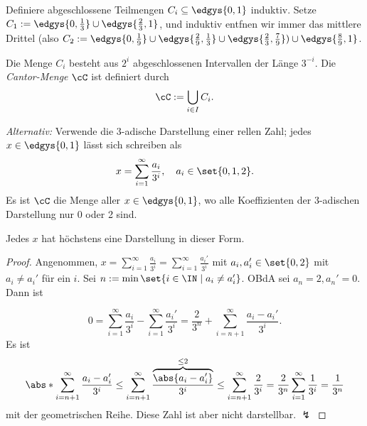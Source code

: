 \documentclass[language=ngerman]{TemplateLecture} %
\begin{document}
\begin{definition}
    Definiere abgeschlossene Teilmengen $C_i \subseteq \edgys{0,1}$ induktiv. Setze $C_1 := \edgys{0,\frac{1}{3}} \cup \edgys{\frac{2}{3},1}$, und induktiv entfnen wir immer das mittlere Drittel (also $C_2 := \edgys{0,\frac{1}{9}} \cup \edgys{\frac{2}{9},\frac{1}{3}} \cup \edgys{\frac{2}{3},\frac{7}{9}}) \cup \edgys{\frac{8}{9}, 1}$.

    Die Menge $C_i$ besteht aus $2^i$ abgeschlossenen Intervallen der Länge $3^{-i}$. Die \emph{Cantor-Menge} $\cC$ ist definiert durch 
    \begin{equation*}
        \cC := \bigcup_{i \in I} C_i.
    \end{equation*}
\end{definition}
\emph{Alternativ:} Verwende die $3$-adische Darstellung einer rellen Zahl; jedes $x \in \edgys{0,1}$ lässt sich schreiben als 
\begin{equation*}
    x = \sum_{i = 1}^\infty \frac{a_i}{3^i}, \quad a_i \in \set{0,1,2}.
\end{equation*}
Es ist $\cC$ die Menge aller $x \in \edgys{0,1}$, wo alle Koeffizienten der 3-adischen Darstellung nur 0 oder 2 sind. 

\begin{remark}
    Jedes $x$ hat höchstens eine Darstellung in dieser Form.
\end{remark}
\begin{proof}
    Angenommen, $x = \sum_{i = 1}^\infty \frac{a_i}{3^i} = \sum_{i = 1}^\infty \frac{a_i'}{3^i}$ mit $a_i, a_i' \in \set{0,2}$ mit $a_i \neq a_i'$ für ein $i$. Sei $n := \min\set{i \in \IN \mid a_i \neq a_i'}$.  OBdA sei $a_n = 2, a_n' = 0$. Dann ist 

    \begin{equation*}
        0 = \sum_{i = 1}^\infty \frac{a_i}{3^i} - \sum_{i = 1}^\infty \frac{a_i'}{3^i} = \frac{2}{3^n} + \sum_{i = n+1}^\infty \frac{a_i - a_i'}{3^i}.
    \end{equation*}
    Es ist 
    \begin{equation*}
        \abs*{\sum_{i = n+1}^\infty \frac{a_i - a_i'}{3^i}} \leq \sum_{i = n+1}^\infty \frac{\overset{\leq 2}{\overbrace{\abs{a_i - a_i'}}}}{3^i} \leq \sum_{i = n+1}^\infty \frac{2}{3^i} = \frac{2}{3^n} \sum_{i = 1}^\infty \frac{1}{3^i} = \frac{1}{3^n}
    \end{equation*}
    mit der geometrischen Reihe. Diese Zahl ist aber nicht darstellbar. $\lightning$
\end{proof}
\end{document}
